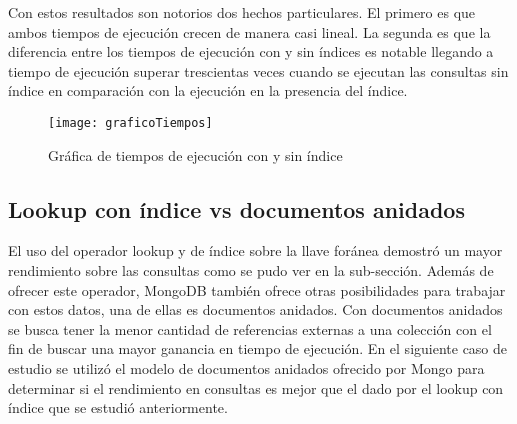 \documentclass[conference,compsoc]{sty/IEEEtran}
\begin{document}
Con estos resultados son notorios dos hechos particulares. El primero es que ambos tiempos de ejecución crecen de manera casi lineal. %
La segunda es que la diferencia entre los tiempos de ejecución con y sin índices es notable llegando a tiempo de ejecución superar trescientas veces cuando se ejecutan las consultas sin índice en comparación con la ejecución en la presencia del índice. %


\begin{figure}
\begin{center}
\texttt{[image: graficoTiempos]}
\end{center}
\caption{Gráfica de tiempos de ejecución con y sin índice} 
\label{fig:conysin_indice}
\end{figure}

\subsection{Lookup con índice vs documentos anidados}

El uso del operador lookup y de índice sobre la llave foránea demostró un mayor rendimiento sobre las consultas como se pudo ver en la sub-sección. Además de ofrecer este operador, MongoDB también ofrece otras posibilidades para trabajar con estos datos, una de ellas es documentos anidados. Con documentos anidados se busca tener la menor cantidad de referencias externas a una colección con el fin de buscar una mayor ganancia en tiempo de ejecución. En el siguiente caso de estudio se utilizó el modelo de documentos anidados ofrecido por Mongo para determinar si el rendimiento en consultas es mejor que el dado por el lookup con índice que se estudió anteriormente. 
\end{document}
